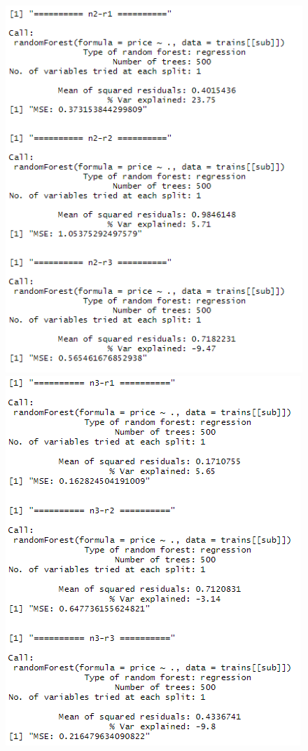 \documentclass{FR16}
\begin{document}
\begin{figure}[!htb]
\begin{minipage}{0.33\textwidth}
     \centering
     \includegraphics[width=1\linewidth]{figures/rf3.png}
   \end{minipage}
   \begin{minipage}{0.33\textwidth}
     \centering
     \includegraphics[width=1\linewidth]{figures/rf4.png} 

\end{minipage}
\end{figure}
\end{document}

